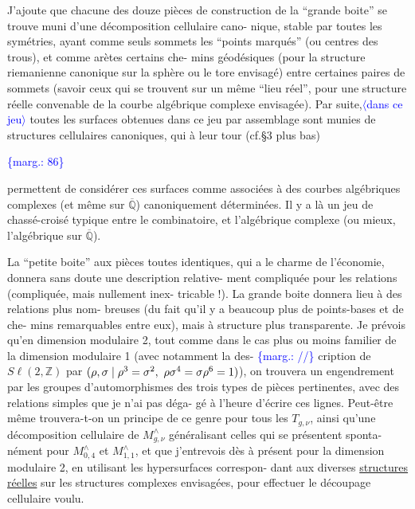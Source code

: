 \documentclass[11pt]{article}
\newcommand{\scanpage}[1]{\par\bigskip\noindent{\small\sffamily[scan #1]}\par}
\newcommand{\mspage}[1]{{\small\sffamily[p.\,#1]}}
\let\over\relax
\newcommand{\over}[2]{\textcolor{gray}{#1}\textcolor{blue}{\ensuremath{^{\!\nearrow}}#2}}
\newcommand{\inserted}[2][]{\textcolor{blue}{$\langle$#2$\rangle$}}
\newcommand{\margin}[1]{\textcolor{blue}{\{\textsf{marg.:} #1\}}}
\newcommand{\uline}[1]{\underline{#1}}
\begin{document}
J'ajoute que chacune des douze pièces de construction de
la ``grande boite'' se trouve muni d'une décomposition cellulaire cano-%
nique, stable par toutes les symétries, ayant comme seuls sommets les
``points marqués'' (ou centres des trous), et comme arètes certains che-%
mins géodésiques (pour la structure riemanienne canonique sur la sphère
ou le tore envisagé) entre certaines paires de sommets (savoir ceux
qui se trouvent sur un même ``lieu réel'', pour une structure réelle
convenable de la courbe algébrique complexe envisagée). Par suite,\inserted{dans ce jeu}
toutes les surfaces obtenues dans ce jeu par assemblage sont munies
de structures cellulaires canoniques, qui à leur tour (cf.§3 plus bas)

\margin{86}

\clearpage
\scanpage{119/87}
\mspage{9}

permettent de considérer ces surfaces comme associées à des courbes
algébriques complexes (et même sur $\overline{\mathbb{Q}}$) canoniquement déterminées.
Il y a là un jeu de chassé-croisé typique entre le combinatoire,
et l'algébrique complexe (ou mieux, l'algébrique sur $\overline{\mathbb{Q}}$).

La ``petite boite'' aux pièces toutes identiques, qui a le
charme de l'économie, donnera sans doute une description relative-%
ment compliquée pour les relations (compliquée, mais nullement inex-%
tricable !). La grande boite donnera lieu à des relations plus nom-%
breuses (du fait qu'il y a beaucoup plus de points-bases et de che-%
mins remarquables entre eux), mais à structure plus transparente. Je
prévois qu'en dimension modulaire 2, tout comme dans le cas plus ou
moins familier de la dimension modulaire 1 (avec notamment la des-%
\margin{//} cription de $S\ell(2,\mathbb{Z})$ par $(\rho,\sigma \mid \rho^3 = \sigma^2,\ \over{\rho}{\sigma}^4 = \over{\sigma}{\rho}^6 = 1)$), on trouvera
un engendrement par les groupes d'automorphismes des trois types de
pièces pertinentes, avec des relations simples que je n'ai pas déga-%
gé à l'heure d'écrire ces lignes. Peut-être même trouvera-t-on un
principe de ce genre pour tous les $T_{g,\nu}$, ainsi qu'une décomposition
cellulaire de $M^{\wedge}_{g,\nu}$ généralisant celles qui se présentent sponta-%
nément pour $M^{\wedge}_{0,4}$ et $M^{\wedge}_{1,1}$, et que j'entrevois dès à présent pour
la dimension modulaire 2, en utilisant les hypersurfaces correspon-%
dant aux diverses \uline{structures réelles} sur les structures complexes
envisagées, pour effectuer le découpage cellulaire voulu.
\end{document}

